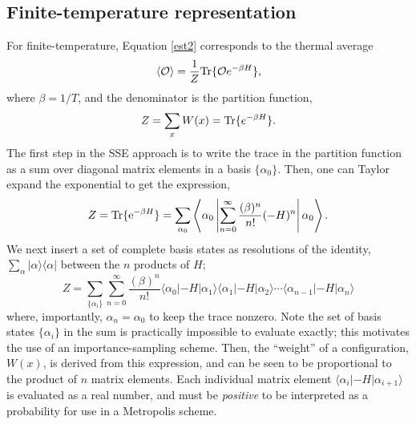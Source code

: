 \documentclass[vecphys]{svmult}
\begin{document}
\subsection{Finite-temperature representation} \label{finiteT}

For finite-temperature, Equation \ref{est2} corresponds to the thermal average
\begin{equation}
\langle \mathcal{O} \rangle  = \frac{1}{Z} {\rm Tr} \{ \mathcal{O} e^{- \beta H} \}, \label{finiteTmeas}
\end{equation}
where $\beta = 1/T$, and the denominator is the partition function,
\begin{equation}
Z = \sum_x W(x) = {\rm Tr} \{ e^{- \beta H} \}. \label{MarkZ}
\end{equation}
The first step in the SSE approach is to write the trace in the partition function as a sum over diagonal matrix elements in a basis $\{ \alpha_0 \}$.  Then, one can Taylor expand the exponential to get the expression,
\begin{equation}
Z={\rm Tr} \{ {\rm e}^{-\beta H} \}=\sum_{\alpha_0} \left\langle{ \alpha_0 \left|{ \sum_{n=0}^{\infty} \frac{( \beta)^n}{n !} (-H)^n} \right| \alpha_0   }\right\rangle.
 \label{Zsse1}
\end{equation}
We next insert a set of complete basis states as resolutions of the identity, $\sum_{\alpha} |\alpha \rangle  \langle \alpha |$ between the $n$ products of $H$;
\begin{equation}
 Z=\sum_{\{ \alpha_i \}} \sum_{n=0}^{\infty} \frac{(\beta)^n}{n !} 
\langle \alpha_{0} | -H | \alpha_{1} \rangle \langle \alpha_1 | -H | \alpha_2\rangle  \cdots \langle \alpha_{n-1} | -H| \alpha_{n} \rangle
\label{Zsse2}
\end{equation}
where, importantly,  $\alpha_{n}=\alpha_0$ to keep the trace nonzero.  
Note the set of basis states $\{ \alpha_i \}$ in the sum is practically impossible to evaluate exactly; this motivates the use of an importance-sampling scheme.  Then,
the ``weight'' of a configuration, $W(x)$, is derived from this expression, and can be seen to be proportional to the product of $n$ matrix elements.  Each individual matrix element $\langle{\alpha_{i} \left| {-H} \right| \alpha_{i+1}   }\rangle$ is evaluated as a real number, and must be {\em positive} to be interpreted as a probability  for use in a Metropolis scheme.  
\end{document}
